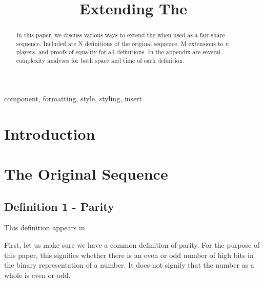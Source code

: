 \documentclass[conference]{IEEEtran}
\begin{document}
\title{Extending The \TMS}

\author{
\and
{}
}

\maketitle

\begin{abstract}
In this paper, we discuss various ways to extend the \TMS when used as a fair-share sequence. Included are N definitions of the original sequence, M extensions to $n$ players, and proofs of equality for all definitions. In the appendix are several complexity analyses for both space and time of each definition.
\end{abstract}

\begin{IEEEkeywords}
component, formatting, style, styling, insert
\end{IEEEkeywords}

\section{Introduction}

\section{The Original Sequence}

\subsection{Definition 1 - Parity}

This definition appears in \cite{Spiegelhofer_2020, Allouche-Shallit_1999}

First, let us make sure we have a common definition of parity. For the purpose of this paper, this signifies whether there is an even or odd number of high bits in the binary representation of a number. It does not signify that the number as a whole is even or odd.
\end{document}
